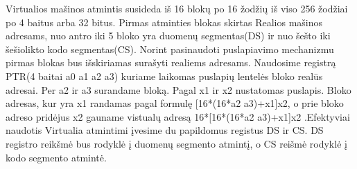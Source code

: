 \documentclass[oneside]{VUMIFPSkursinis}
\begin{document}
	Virtualios mašinos atmintis susideda iš 16 blokų po 16 žodžių iš viso 256 žodžiai po 4 baitus arba 32 bitus. Pirmas atminties blokas skirtas Realios mašinos adresams, nuo antro iki 5 bloko yra duomenų segmentas(DS) ir nuo šešto iki šešiolikto kodo segmentas(CS). Norint pasinaudoti puslapiavimo mechanizmu pirmas blokas bus išskiriamas surašyti realiems adresams. Naudosime registrą PTR(4 baitai a0 a1 a2 a3) kuriame laikomas puslapių lentelės bloko realūs adresai. Per a2 ir a3 surandame bloką. Pagal x1 ir x2 nustatomas puslapis. Bloko adresas, kur yra x1 randamas pagal formulę [16*(16*a2 a3)+x1]x2, o prie bloko adreso pridėjus x2 gauname vistualų adresą 16*[16*(16*a2 a3)+x1]x2 .Efektyviai naudotis Virtualia atmintimi įvesime du papildomus registus DS ir CS. DS registro reikšmė bus rodyklė į duomenų segmento atmintį, o CS reišmė rodyklė į kodo segmento atmintė.
\end{document}
